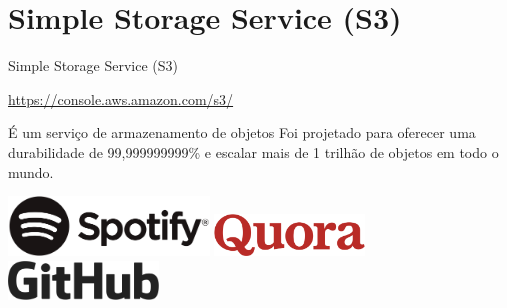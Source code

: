 \documentclass[xcolor=table]{beamer}
\begin{document}
\section{Simple Storage Service (S3)}
\begin{frame}[c]{Simple Storage Service (S3)}

        \begin{outline}
            \1[]\url{https://console.aws.amazon.com/s3/}
        \end{outline}
        
        \begin{center}
            \begin{outline}                
                \1 É um serviço de armazenamento de objetos
                \1 Foi projetado para oferecer uma durabilidade de 99,999999999\% e escalar mais de 1 trilhão de objetos em todo o mundo.
            \end{outline}
            \vspace{0.5cm}
            \begin{minipage}{0.8\textwidth}
            \begin{center}
                
                \includegraphics[width=0.4\textwidth]{introducao/spot.png}
                \hspace{1cm}
                \includegraphics[width=0.3\textwidth]{introducao/quora-logo.png}
                \vspace{0.5cm}
                \includegraphics[width=0.3\textwidth]{introducao/git-logo.png}
            \end{center}
            
            \end{minipage}
            
        \end{center}  
        
\end{frame}
\end{document}
